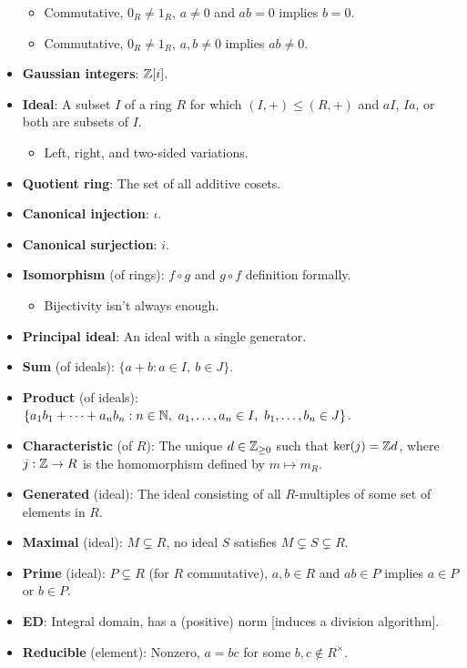 \documentclass[../notes.tex]{subfiles}
\begin{document}
\begin{itemize}
    \begin{itemize}
        \item Commutative, $0_R\neq 1_R$, $a\neq 0$ and $ab=0$ implies $b=0$.
        \item Commutative, $0_R\neq 1_R$, $a,b\neq 0$ implies $ab\neq 0$.
    \end{itemize}
    \item \textbf{Gaussian integers}: $\mathbb{Z}[i]$.
    \item \textbf{Ideal}: A subset $I$ of a ring $R$ for which $(I,+)\leq(R,+)$ and $aI$, $Ia$, or both are subsets of $I$.
    \begin{itemize}
        \item Left, right, and two-sided variations.
    \end{itemize}
    \item \textbf{Quotient ring}: The set of all additive cosets.
    \item \textbf{Canonical injection}: $\iota$.
    \item \textbf{Canonical surjection}: $i$.
    \item \textbf{Isomorphism} (of rings): $f\circ g$ and $g\circ f$ definition formally.
    \begin{itemize}
        \item Bijectivity isn't always enough.
    \end{itemize}
    \item \textbf{Principal ideal}: An ideal with a single generator.
    \item \textbf{Sum} (of ideals): $\{a+b:a\in I,\ b\in J\}$.
    \item \textbf{Product} (of ideals): $\{a_1b_1+\cdots+a_nb_n:n\in\mathbb{N},\ a_1,\dots,a_n\in I,\ b_1,\dots,b_n\in J\}$.
    \item \textbf{Characteristic} (of $R$): The unique $d\in{\mathbb{Z}_{\geq 0}}$ such that $\ker(j)=\mathbb{Z} d$, where $j:\mathbb{Z}\to R$ is the homomorphism defined by $m\mapsto m_R$.
    \item \textbf{Generated} (ideal): The ideal consisting of all $R$-multiples of some set of elements in $R$.
    \item \textbf{Maximal} (ideal): $M\subsetneq R$, no ideal $S$ satisfies $M\subsetneq S\subsetneq R$.
    \item \textbf{Prime} (ideal): $P\subsetneq R$ (for $R$ commutative), $a,b\in R$ and $ab\in P$ implies $a\in P$ or $b\in P$.
    \item \textbf{ED}: Integral domain, has a (positive) norm [induces a division algorithm].
    \item \textbf{Reducible} (element): Nonzero, $a=bc$ for some $b,c\notin R^\times$.

\end{itemize}
\end{document}
